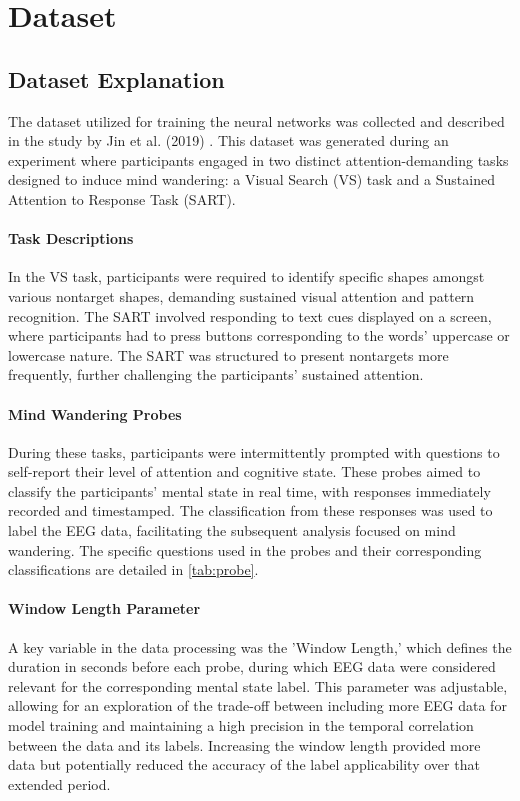 \section{Dataset}

\subsection{Dataset Explanation}
The dataset utilized for training the neural networks was collected and described in the study by Jin et al. (2019) \cite{Jin2019PredictingMW}. This dataset was generated during an experiment where participants engaged in two distinct attention-demanding tasks designed to induce mind wandering: a Visual Search (VS) task and a Sustained Attention to Response Task (SART).

\paragraph{Task Descriptions}
In the VS task, participants were required to identify specific shapes amongst various nontarget shapes, demanding sustained visual attention and pattern recognition. The SART involved responding to text cues displayed on a screen, where participants had to press buttons corresponding to the words' uppercase or lowercase nature. The SART was structured to present nontargets more frequently, further challenging the participants' sustained attention.

\paragraph{Mind Wandering Probes}
During these tasks, participants were intermittently prompted with questions to self-report their level of attention and cognitive state. These probes aimed to classify the participants' mental state in real time, with responses immediately recorded and timestamped. The classification from these responses was used to label the EEG data, facilitating the subsequent analysis focused on mind wandering. The specific questions used in the probes and their corresponding classifications are detailed in \autoref{tab:probe}.

\paragraph{Window Length Parameter}
A key variable in the data processing was the 'Window Length,' which defines the duration in seconds before each probe, during which EEG data were considered relevant for the corresponding mental state label. This parameter was adjustable, allowing for an exploration of the trade-off between including more EEG data for model training and maintaining a high precision in the temporal correlation between the data and its labels. Increasing the window length provided more data but potentially reduced the accuracy of the label applicability over that extended period.

